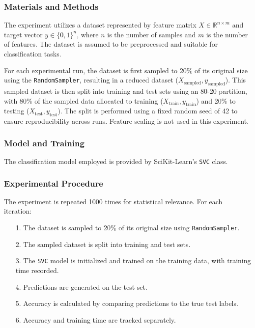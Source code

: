\documentclass{article}
\theoremstyle{plain}
\theoremstyle{definition}
\theoremstyle{remark}
\begin{document}
\subsubsection{Materials and Methods}

The experiment utilizes a dataset represented by feature matrix $ X \in \mathbb{R}^{n \times m} $ and target vector $ y \in \{0, 1\}^n $, where $ n $ is the number of samples and $ m $ is the number of features. The dataset is assumed to be preprocessed and suitable for classification tasks.

For each experimental run, the dataset is first sampled to 20\% of its original size using the \texttt{RandomSampler}, resulting in a reduced dataset ($ X_{\text{sampled}}, y_{\text{sampled}} $). This sampled dataset is then split into training and test sets using an 80-20 partition, with 80\% of the sampled data allocated to training ($ X_{\text{train}}, y_{\text{train}} $) and 20\% to testing ($ X_{\text{test}}, y_{\text{test}} $). The split is performed using a fixed random seed of 42 to ensure reproducibility across runs. Feature scaling is not used in this experiment.

\subsubsection{Model and Training}

The classification model employed is provided by SciKit-Learn's \texttt{SVC} class.

\subsubsection{Experimental Procedure}

The experiment is repeated 1000 times for statistical relevance. For each iteration:

\begin{itemize}
	\item [1.] The dataset is sampled to 20\% of its original size using \texttt{RandomSampler}.
	\item [2.] The sampled dataset is split into training and test sets.
	\item [3.] The \texttt{SVC} model is initialized and trained on the training data, with training time recorded.
	\item [4.] Predictions are generated on the test set.
	\item [5.] Accuracy is calculated by comparing predictions to the true test labels.
	\item [6.] Accuracy and training time are tracked separately.
\end{itemize}
\end{document}
